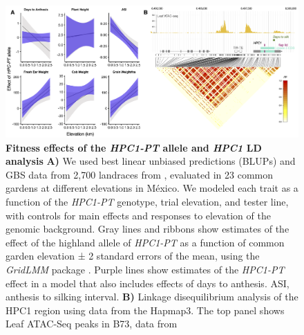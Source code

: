\documentclass[9pt,twocolumn,twoside,lineno]{biorxiv}
\newcommand{\hpc}{\textit{HPC1}\xspace}
\begin{document}
\begin{figure}[htp]
\begin{center}
\includegraphics[width=0.8\paperwidth]{Figures/Fig_4.png}
\caption{\textbf{Fitness effects of the \textit{HPC1-PT} allele and \hpc LD analysis} \textbf{A)}
We used best linear unbiased predictions (BLUPs) and GBS data from 2,700 landraces from \cite{Gates2019-xu}, evaluated in 23 common gardens at different elevations in M\'exico. 
We modeled each trait as a function of the \textit{HPC1-PT} genotype, trial elevation, and tester line, with controls for main effects and responses to elevation of the genomic background. 
Gray lines and ribbons show estimates of the effect of the highland allele of \textit{HPC1-PT} as a function of common garden elevation ± 2 standard errors of the mean, using the \textit{GridLMM} package \cite{Runcie2019-Gr}. 
Purple lines show estimates of the \textit{HPC1-PT} effect in a model that also includes effects of days to anthesis. ASI, anthesis to silking interval. \textbf{B)} Linkage disequilibrium analysis of the HPC1 region using data from the Hapmap3. The top panel shows Leaf ATAC-Seq peaks in B73, data from  \cite{Ricci2019-zj}}
\label{Fig4}
\end{center}
\end{figure}
\end{document}
